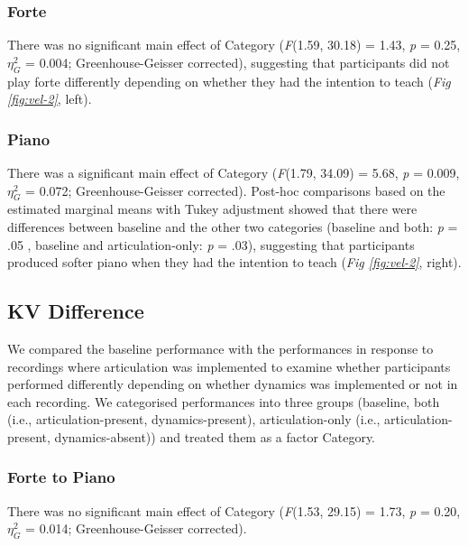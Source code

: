 \documentclass[
  man,floatsintext]{apa6}
\begin{document}
\hypertarget{forte-1}{%
\subsubsection{Forte}\label{forte-1}}

There was no significant main effect of Category (\emph{F}(1.59, 30.18) = 1.43, \emph{p} = 0.25, \(\eta_G^2\) = 0.004; Greenhouse-Geisser corrected), suggesting that participants did not play forte differently depending on whether they had the intention to teach (\emph{Fig \ref{fig:vel-2}}, left).

\hypertarget{piano-1}{%
\subsubsection{Piano}\label{piano-1}}

There was a significant main effect of Category (\emph{F}(1.79, 34.09) = 5.68, \emph{p} = 0.009, \(\eta_G^2\) = 0.072; Greenhouse-Geisser corrected). Post-hoc comparisons based on the estimated marginal means with Tukey adjustment showed that there were differences between baseline and the other two categories (baseline and both: \emph{p} = .05 , baseline and articulation-only: \emph{p} = .03), suggesting that participants produced softer piano when they had the intention to teach (\emph{Fig \ref{fig:vel-2}}, right).

\hypertarget{kv-difference-1}{%
\subsection{KV Difference}\label{kv-difference-1}}

We compared the baseline performance with the performances in response to recordings where articulation was implemented to examine whether participants performed differently depending on whether dynamics was implemented or not in each recording. We categorised performances into three groups (baseline, both (i.e., articulation-present, dynamics-present), articulation-only (i.e., articulation-present, dynamics-absent)) and treated them as a factor Category.

\hypertarget{forte-to-piano-1}{%
\subsubsection{Forte to Piano}\label{forte-to-piano-1}}

There was no significant main effect of Category (\emph{F}(1.53, 29.15) = 1.73, \emph{p} = 0.20, \(\eta_G^2\) = 0.014; Greenhouse-Geisser corrected).
\end{document}

